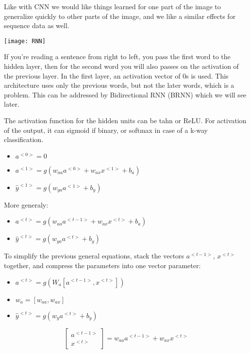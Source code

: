 Like with CNN we would like things learned for one part of the image to generalize quickly to other parts of the image, and we like a similar effects for sequence data as well.

\texttt{[image: RNN]}

If you're reading a sentence from right to left, you pass the first word to the hidden layer, then for the second word you will also passes on the activation of the previous layer. In the first layer, an activation vector of 0s is used. This architecture uses only the previous words, but not the later words, which is a problem. This can be addressed by Bidirectional RNN (BRNN) which we will see later.


The activation function for the hidden units can be tahn or ReLU.
For activation of the output, it can sigmoid if binary, or softmax in case of a k-way classification.

\begin{itemize}
    \item $a^{<0>} = 0$
    \item $a^{<1>} = g(w_{aa} a^{<0>} + w_{ax} x^{<1>} + b_a)$
    \item $\hat{y}^{<1>} = g(w_{ya} a^{<1>} + b_y)$
\end{itemize}

More generaly:
\begin{itemize}
    \item $a^{<t>} = g(w_{aa} a^{<t-1>} + w_{ax} x^{<t>} + b_a)$
    \item $\hat{y}^{<t>} = g(w_{ya} a^{<t>} + b_y)$
\end{itemize}

To simplify the previous general equations, stack the vectors $a^{<t-1>}$, $x^{<t>}$ together, and compress the parameters into one vector parameter:
\begin{itemize}
    \item $a^{<t>} = g(W_{a} [a^{<t-1>}, x^{<t>}])$
    \item $w_{a} = [ w_{aa}, w_{ax} ]$
    \item $\hat{y}^{<t>} = g(w_{y} a^{<t>} + b_y)$
\end{itemize}

\begin{equation*}
    [ w_{aa}, w_{ax} ] \begin{bmatrix}
           a^{<t-1>} \\
           x^{<t>}
         \end{bmatrix} = w_{aa} a^{<t-1>} + w_{ax} x^{<t>}
\end{equation*}

